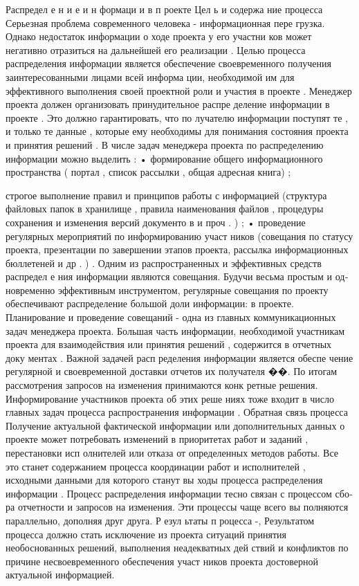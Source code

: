 Распредел е н и е и н формаци и
в п роекте
Цел ь и содержа ние процесса
Серьезная проблема современного человека - информационная пере­
грузка. Однако недостаток информации о ходе проекта у его участни­
ков может негативно отразиться на дальнейшей его реализации .
Целью процесса распределения информации является обеспечение
своевременного получения заинтересованными лицами всей информа­
ции, необходимой им для эффективного выполнения своей проектной
роли и участия в проекте .
Менеджер проекта должен организовать принудительное распре­
деление информации в проекте . Это должно гарантировать, что по­
лучателю информации поступят те , и только те данные , которые ему
необходимы для понимания состояния проекта и принятия решений .
В числе задач менеджера проекта по распределению информации
можно выделить :
•
формирование общего информационного пространства ( портал ,
список рассылки , общая адресная книга) ;

строгое выполнение правил и принципов работы с информацией
(структура файловых папок в хранилище , правила наименования
файлов , процедуры сохранения и изменения версий документо в
и проч . ) ;
• проведение регулярных мероприятий по информированию участ­
ников (совещания по статусу проекта, презентации по завершении
этапов проекта, рассылка информационных бюллетеней и др . ) .
Одним из распространенных и эффективных средств распредел е­
ния информации являются совещания. Будучи весьма простым и од­
новременно эффективным инструментом, регулярные совещания по
проекту обеспечивают распределение большой доли информации: в
проекте. Планирование и проведение совещаний - одна из главных
коммуникационных задач менеджера проекта.
Большая часть информации, необходимой участникам проекта для
взаимодействия или принятия решений , содержится в отчетных доку­
ментах . Важной задачей расп ределения информации является обеспе­
чение регулярной и своевременной доставки отчетов их получателя ��.
По итогам рассмотрения запросов на изменения принимаются конк­
ретные решения. Информирование участников проекта об этих реше­
ниях тоже входит в число главных задач процесса распространения
информации .
Обратная связь процесса
Получение актуальной фактической информации или дополнительных
данных о проекте может потребовать изменений в приоритетах работ
и заданий , перестановки исп олнителей или отказа от определенных
методов работы. Все это станет содержанием процесса координации
работ и исполнителей , исходными данными для которого станут вы­
ходы процесса распределения информации .
Процесс распределения информации тесно связан с процессом сбо­
ра отчетности и запросов на изменения. Эти процессы чаще всего вы­
полняются параллельно, дополняя друг друга.
Р езул ьтаты п роцесса
-,
Результатом процесса должно стать исключение из проекта ситуаций
принятия необоснованных решений, выполнения неадекватных дей­
ствий и конфликтов по причине несвоевременного обеспечения участ­
ников проекта достоверной актуальной информацией.